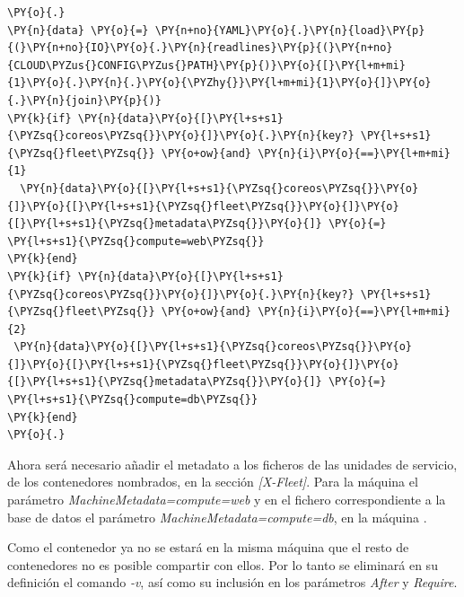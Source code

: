 \begin{codelisting}
\label{code:vagrantfile2}
\begin{Verbatim}[fontsize=\relsize{-2.5},fontseries=b,commandchars=\\\{\}]
\PY{o}{.}
\PY{n}{data} \PY{o}{=} \PY{n+no}{YAML}\PY{o}{.}\PY{n}{load}\PY{p}{(}\PY{n+no}{IO}\PY{o}{.}\PY{n}{readlines}\PY{p}{(}\PY{n+no}{CLOUD\PYZus{}CONFIG\PYZus{}PATH}\PY{p}{)}\PY{o}{[}\PY{l+m+mi}{1}\PY{o}{.}\PY{n}{.}\PY{o}{\PYZhy{}}\PY{l+m+mi}{1}\PY{o}{]}\PY{o}{.}\PY{n}{join}\PY{p}{)}
\PY{k}{if} \PY{n}{data}\PY{o}{[}\PY{l+s+s1}{\PYZsq{}coreos\PYZsq{}}\PY{o}{]}\PY{o}{.}\PY{n}{key?} \PY{l+s+s1}{\PYZsq{}fleet\PYZsq{}} \PY{o+ow}{and} \PY{n}{i}\PY{o}{==}\PY{l+m+mi}{1}
  \PY{n}{data}\PY{o}{[}\PY{l+s+s1}{\PYZsq{}coreos\PYZsq{}}\PY{o}{]}\PY{o}{[}\PY{l+s+s1}{\PYZsq{}fleet\PYZsq{}}\PY{o}{]}\PY{o}{[}\PY{l+s+s1}{\PYZsq{}metadata\PYZsq{}}\PY{o}{]} \PY{o}{=} \PY{l+s+s1}{\PYZsq{}compute=web\PYZsq{}}
\PY{k}{end}
\PY{k}{if} \PY{n}{data}\PY{o}{[}\PY{l+s+s1}{\PYZsq{}coreos\PYZsq{}}\PY{o}{]}\PY{o}{.}\PY{n}{key?} \PY{l+s+s1}{\PYZsq{}fleet\PYZsq{}} \PY{o+ow}{and} \PY{n}{i}\PY{o}{==}\PY{l+m+mi}{2}
 \PY{n}{data}\PY{o}{[}\PY{l+s+s1}{\PYZsq{}coreos\PYZsq{}}\PY{o}{]}\PY{o}{[}\PY{l+s+s1}{\PYZsq{}fleet\PYZsq{}}\PY{o}{]}\PY{o}{[}\PY{l+s+s1}{\PYZsq{}metadata\PYZsq{}}\PY{o}{]} \PY{o}{=} \PY{l+s+s1}{\PYZsq{}compute=db\PYZsq{}}
\PY{k}{end}
\PY{o}{.}
\end{Verbatim}
\end{codelisting}

Ahora será necesario añadir el metadato a los ficheros de las unidades de servicio, de los contenedores nombrados, en la sección \textit{[X-Fleet]}. Para la máquina  el parámetro \textit{MachineMetadata=compute=web} y en el fichero correspondiente a la base de datos el parámetro \textit{MachineMetadata=compute=db}, en la máquina .

Como el contenedor  ya no se estará en la misma máquina que el resto de contenedores no es posible compartir  con ellos. Por lo tanto se eliminará en su definición el comando \textit{-v}, así como su inclusión en los parámetros \textit{After} y \textit{Require}.

